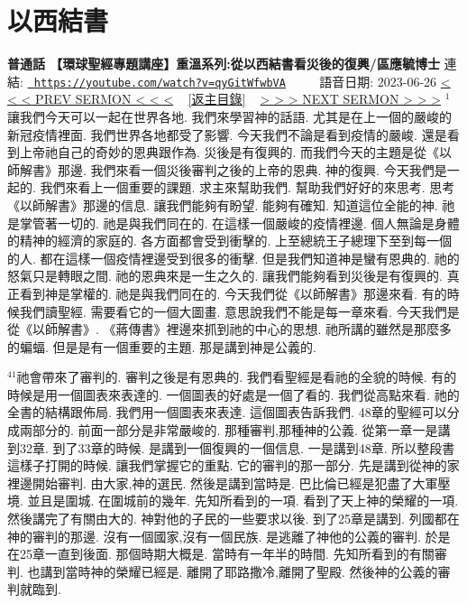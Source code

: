 \documentclass{book}
\begin{document}
\section{以西結書}
\label{sec:qyGitWfwbVA}
\textbf{普通話 【環球聖經專題講座】重溫系列:從以西結書看災後的復興/區應毓博士}
\newline
\newline
連結: \href{https://youtube.com/watch?v=qyGitWfwbVA}{\texttt{ https://youtube.com/watch?v=qyGitWfwbVA}} ~~~~ 語音日期: 2023-06-26 
\newline
\newline
\hyperref[sec:Qb_2t8khpeA]{\small{< < < PREV SERMON < < <}}
~
\hyperref[sec:index]{\small{[返主目錄]}}
~
\hyperref[sec:jEVzLmVIzKo]{\small{> > > NEXT SERMON > > >}}
\newline
\newline
$^{1}$讓我們今天可以一起在世界各地.
我們來學習神的話語.
尤其是在上一個的嚴峻的新冠疫情裡面.
我們世界各地都受了影響.
今天我們不論是看到疫情的嚴峻.
還是看到上帝祂自己的奇妙的恩典跟作為.
災後是有復興的.
而我們今天的主題是從《以師解書》那邊.
我們來看一個災後審判之後的上帝的恩典.
神的復興.
今天我們是一起的.
我們來看上一個重要的課題.
求主來幫助我們.
幫助我們好好的來思考.
思考《以師解書》那邊的信息.
讓我們能夠有盼望.
能夠有確知.
知道這位全能的神.
祂是掌管著一切的.
祂是與我們同在的.
在這樣一個嚴峻的疫情裡邊.
個人無論是身體的精神的經濟的家庭的.
各方面都會受到衝擊的.
上至總統王子總理下至到每一個的人.
都在這樣一個疫情裡邊受到很多的衝擊.
但是我們知道神是蠻有恩典的.
祂的怒氣只是轉眼之間.
祂的恩典來是一生之久的.
讓我們能夠看到災後是有復興的.
真正看到神是掌權的.
祂是與我們同在的.
今天我們從《以師解書》那邊來看.
有的時候我們讀聖經.
需要看它的一個大圖畫.
意思說我們不能是每一章來看.
今天我們是從《以師解書》.
《蔣傳書》裡邊來抓到祂的中心的思想.
祂所講的雖然是那麼多的蝙蝠.
但是是有一個重要的主題.
那是講到神是公義的.

$^{41}$祂會帶來了審判的.
審判之後是有恩典的.
我們看聖經是看祂的全貌的時候.
有的時候是用一個圖表來表達的.
一個圖表的好處是一個了看的.
我們從高點來看.
祂的全書的結構跟佈局.
我們用一個圖表來表達.
這個圖表告訴我們.
48章的聖經可以分成兩部分的.
前面一部分是非常嚴峻的.
那種審判,那種神的公義.
從第一章一是講到32章.
到了33章的時候.
是講到一個復興的一個信息.
一是講到48章.
所以整段書這樣子打開的時候.
讓我們掌握它的重點.
它的審判的那一部分.
先是講到從神的家裡邊開始審判.
由大家,神的選民.
然後是講到當時是.
巴比倫已經是犯盡了大軍壓境.
並且是圍城.
在圍城前的幾年.
先知所看到的一項.
看到了天上神的榮耀的一項.
然後講完了有關由大的.
神對他的子民的一些要求以後.
到了25章是講到.
列國都在神的審判的那邊.
沒有一個國家,沒有一個民族.
是逃離了神他的公義的審判.
於是在25章一直到後面.
那個時期大概是.
當時有一年半的時間.
先知所看到的有關審判.
也講到當時神的榮耀已經是.
離開了耶路撒冷,離開了聖殿.
然後神的公義的審判就臨到.
\end{document}
